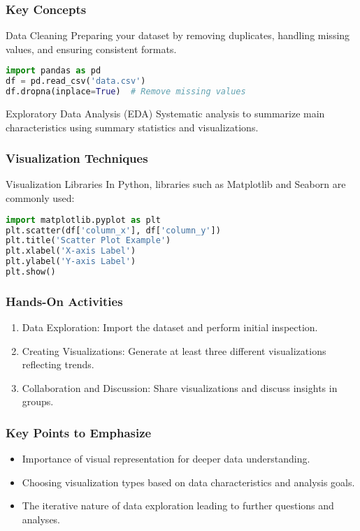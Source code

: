 \documentclass[aspectratio=169]{beamer}
\begin{document}
\begin{frame}[fragile]
    \frametitle{Key Concepts}
    \begin{block}{Data Cleaning}
        Preparing your dataset by removing duplicates, handling missing values, and ensuring consistent formats.
        \begin{lstlisting}[language=Python]
import pandas as pd
df = pd.read_csv('data.csv')
df.dropna(inplace=True)  # Remove missing values
        \end{lstlisting}
    \end{block}

    \begin{block}{Exploratory Data Analysis (EDA)}
        Systematic analysis to summarize main characteristics using summary statistics and visualizations.
    \end{block}
\end{frame}

\begin{frame}[fragile]
    \frametitle{Visualization Techniques}
    \begin{block}{Visualization Libraries}
        In Python, libraries such as Matplotlib and Seaborn are commonly used:
        \begin{lstlisting}[language=Python]
import matplotlib.pyplot as plt
plt.scatter(df['column_x'], df['column_y'])
plt.title('Scatter Plot Example')
plt.xlabel('X-axis Label')
plt.ylabel('Y-axis Label')
plt.show()
        \end{lstlisting}
    \end{block}
\end{frame}

\begin{frame}
    \frametitle{Hands-On Activities}
    \begin{enumerate}
        \item Data Exploration: Import the dataset and perform initial inspection.
        \item Creating Visualizations: Generate at least three different visualizations reflecting trends.
        \item Collaboration and Discussion: Share visualizations and discuss insights in groups.
    \end{enumerate}
\end{frame}

\begin{frame}
    \frametitle{Key Points to Emphasize}
    \begin{itemize}
        \item Importance of visual representation for deeper data understanding.
        \item Choosing visualization types based on data characteristics and analysis goals.
        \item The iterative nature of data exploration leading to further questions and analyses.
    \end{itemize}
\end{frame}
\end{document}
